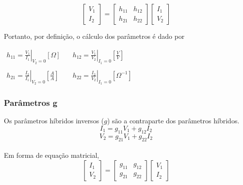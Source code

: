 \documentclass{article}
\numberwithin{equation}{section}
\begin{document}
    \begin{equation}
        \begin{bmatrix}
            V_{1} \\
            I_{2}
        \end{bmatrix}
        = %
        \begin{bmatrix}
            h_{11} & h_{12} \\
            h_{21} & h_{22}
        \end{bmatrix}
        \begin{bmatrix}
            I_{1} \\
            V_{2}
        \end{bmatrix}
    \end{equation}

    Portanto, por definição, o cálculo dos parâmetros é dado por
    \begin{center}
        $\begin{matrix} %
                h_{11}=\displaystyle\left.\frac{V_{1}}{I_{1}}\right|_{V_{2}=0} [\Omega] &\quad h_{12}=\displaystyle\left.\frac{V_{1}}{V_{2}}\right|_{I_{1}=0}\left[\frac{V}{V}\right]\\\\
                h_{21}=\displaystyle\left.\frac{I_{2}}{I_{1}}\right|_{V_{2}=0}\left[\frac{A}{A}\right]&\quad
                h_{22}=\displaystyle\left.\frac{I_{2}}{V_{2}}\right|_{I_{1}=0} [\Omega^{-1}]
        \end{matrix}$
    \end{center}

    \subsubsection{Parâmetros g}
    Os parâmetros híbridos inversos ($g$) são a contraparte dos parâmetros híbridos.
    \begin{equation*}
        I_{1}=g_{11}V_{1}+g_{12}I_{2}
    \end{equation*}
    \begin{equation*}
        V_{2}=g_{21}V_{1}+g_{22}I_{2}
    \end{equation*}\\
    Em forma de equação matricial,
    \begin{equation}
        \begin{bmatrix}
            I_{1} \\
            V_{2}
        \end{bmatrix}
        = %
        \begin{bmatrix}
            g_{11} & g_{12} \\
            g_{21} & g_{22}
        \end{bmatrix}
        \begin{bmatrix}
            V_{1} \\
            I_{2}
        \end{bmatrix}
    \end{equation}
\end{document}
